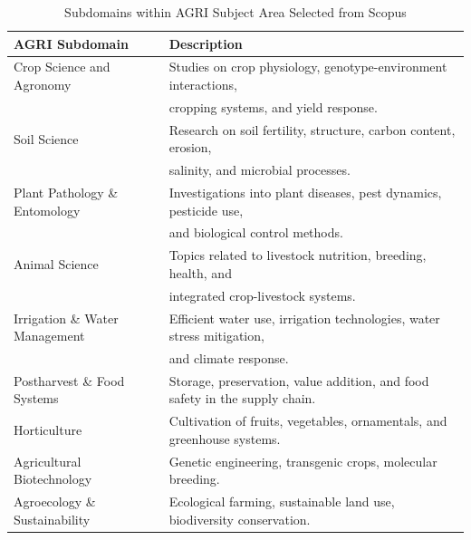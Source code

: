 \documentclass{ieeeaccess}
\begin{document}
\begin{table}[h]
\centering
\caption{Subdomains within AGRI Subject Area Selected from Scopus}
\label{tab:agri-subdomains}
\begin{tabular}{ll}
\toprule
\textbf{AGRI Subdomain} & \textbf{Description} \\
\midrule
Crop Science and Agronomy & Studies on crop physiology, genotype-environment interactions, \\
                          & cropping systems, and yield response. \\
Soil Science & Research on soil fertility, structure, carbon content, erosion, \\
             & salinity, and microbial processes. \\
Plant Pathology \& Entomology & Investigations into plant diseases, pest dynamics, pesticide use, \\
                              & and biological control methods. \\
Animal Science & Topics related to livestock nutrition, breeding, health, and \\
               & integrated crop-livestock systems. \\
Irrigation \& Water Management & Efficient water use, irrigation technologies, water stress mitigation, \\
                              & and climate response. \\
Postharvest \& Food Systems & Storage, preservation, value addition, and food safety in the supply chain. \\
Horticulture & Cultivation of fruits, vegetables, ornamentals, and greenhouse systems. \\
Agricultural Biotechnology & Genetic engineering, transgenic crops, molecular breeding. \\
Agroecology \& Sustainability & Ecological farming, sustainable land use, biodiversity conservation. \\
\bottomrule
\end{tabular}
\end{table}
\end{document}
